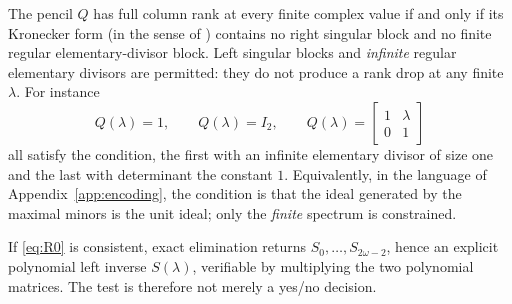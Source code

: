 \begin{remark}\label{rem:kronecker}
The pencil $Q$ has full column rank at every finite complex value if and only if
its Kronecker form (in the sense of \cite{bee88}) contains no right singular
block and no finite regular elementary-divisor block. Left singular blocks and
\emph{infinite} regular elementary divisors are permitted: they do not produce a
rank drop at any finite $\lambda$. For instance
\begin{equation*}
Q(\lambda)=1,\qquad Q(\lambda)=I_2,\qquad
Q(\lambda)=\begin{bmatrix}1&\lambda\\0&1\end{bmatrix}
\end{equation*}
all satisfy the condition, the first with an infinite elementary divisor of size
one and the last with determinant the constant $1$. Equivalently, in the
language of Appendix~\ref{app:encoding}, the condition is that the ideal
generated by the maximal minors is the unit ideal; only the \emph{finite}
spectrum is constrained.
\end{remark}

\begin{remark}[Witness]\label{rem:witness}
If \eqref{eq:R0} is consistent, exact elimination returns
$S_0,\dots,S_{2\omega-2}$, hence an explicit polynomial left inverse
$S(\lambda)$, verifiable by multiplying the two polynomial matrices. The test is
therefore not merely a yes/no decision.
\end{remark}
